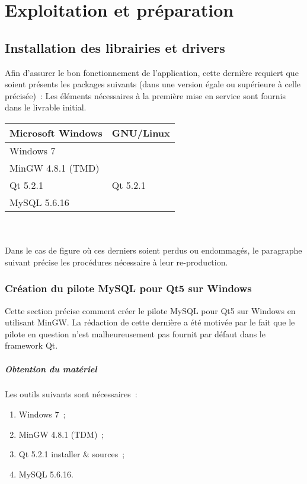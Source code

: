 \chapter{Exploitation et préparation}

% 

\section{Installation des librairies et drivers}
Afin d'assurer le bon fonctionnement de l'application, cette dernière requiert que soient présents les packages suivants (dans une version égale ou supérieure à celle précisée)~:
Les éléments nécessaires à la première mise en service sont fournis dans le livrable initial.
\\

\begin{tabularx}{\linewidth}{X X}
	\toprule
	Microsoft Windows	& GNU/Linux		\\
	\midrule
	Windows 7			&				\\
	MinGW 4.8.1 (TMD)	&				\\
	Qt 5.2.1			& Qt 5.2.1		\\
	MySQL 5.6.16		& 				\\
	\bottomrule
\end{tabularx}
\\
\\
Dans le cas de figure où ces derniers soient perdus ou endommagés, le paragraphe suivant précise les procédures nécessaire à leur re-production.

\subsection{Création du pilote MySQL pour Qt5 sur Windows}
Cette section précise comment créer le pilote MySQL pour Qt5 sur Windows en utilisant MinGW.
La rédaction de cette dernière a été motivée par le fait que le pilote en question n'est malheureusement pas fournit par défaut dans le framework Qt.

\paragraph{Obtention du matériel}
Les outils suivants sont nécessaires~:
\begin{enumerate}
	\item Windows 7~;
	\item MinGW 4.8.1 (TDM)~;
	\item Qt 5.2.1 installer \& sources~;
	\item MySQL 5.6.16.
\end{enumerate} 

